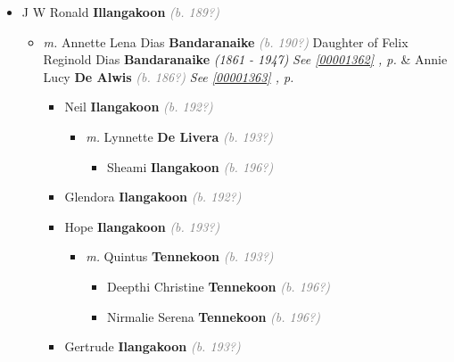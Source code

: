 \documentclass[10pt, openany]{book}
\begin{document}
\begin{itemize}
{\begin{itemize}
{\begin{itemize}
{\begin{itemize}
\end{itemize}}
\end{itemize}
 }
\item{J W Ronald \textbf{Illangakoon} \textcolor{gray}{\textit{(b. 189?)}}
\begin{itemize}
\item{\textit{m.} Annette Lena Dias \textbf{Bandaranaike} \textcolor{gray}{\textit{(b. 190?)}} Daughter of  Felix Reginold Dias \textbf{Bandaranaike} \textcolor{slorange}{\textit{(1861 - 1947)}} \textcolor{slteal}{\textit{See  \autoref{00001362} \textit{, p. \pageref{00001362} }}}  \&  Annie Lucy  \textbf{De Alwis} \textcolor{gray}{\textit{(b. 186?)}} \textcolor{slteal}{\textit{See  \autoref{00001363} \textit{, p. \pageref{00001363} }}}   \label{couple:00001373:00001436} \begin{itemize}
\item{Neil \textbf{Ilangakoon} \textcolor{gray}{\textit{(b. 192?)}}
\begin{itemize}
\item{\textit{m.} Lynnette \textbf{De Livera} \textcolor{gray}{\textit{(b. 193?)}}   \label{couple:00001390:00001391} \begin{itemize}
\item{Sheami \textbf{Ilangakoon} \textcolor{gray}{\textit{(b. 196?)}}
 }
\end{itemize}}
\end{itemize}
 }
\item{Glendora \textbf{Ilangakoon} \textcolor{gray}{\textit{(b. 192?)}}
 }
\item{Hope \textbf{Ilangakoon} \textcolor{gray}{\textit{(b. 193?)}}
\begin{itemize}
\item{\textit{m.} Quintus \textbf{Tennekoon} \textcolor{gray}{\textit{(b. 193?)}}   \label{couple:00001375:00001376} \begin{itemize}
\item{Deepthi Christine \textbf{Tennekoon} \textcolor{gray}{\textit{(b. 196?)}}
  }
\item{Nirmalie Serena \textbf{Tennekoon} \textcolor{gray}{\textit{(b. 196?)}}
  }
\end{itemize}}
\end{itemize}
 }
\item{Gertrude \textbf{Ilangakoon} \textcolor{gray}{\textit{(b. 193?)}}
}
\end{itemize}}
\end{itemize}}
\end{itemize}}
\end{itemize}
\end{document}
